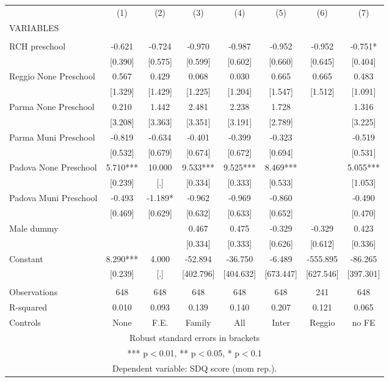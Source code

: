 \begin{tabular}{lccccccc} \hline
 & (1) & (2) & (3) & (4) & (5) & (6) & (7) \\
VARIABLES &  &  &  &  &  &  &  \\ \hline
 &  &  &  &  &  &  &  \\
RCH preschool & -0.621 & -0.724 & -0.970 & -0.987 & -0.952 & -0.952 & -0.751* \\
 & [0.390] & [0.575] & [0.599] & [0.602] & [0.660] & [0.645] & [0.404] \\
Reggio None Preschool & 0.567 & 0.429 & 0.068 & 0.030 & 0.665 & 0.665 & 0.483 \\
 & [1.329] & [1.429] & [1.225] & [1.204] & [1.547] & [1.512] & [1.091] \\
Parma None Preschool & 0.210 & 1.442 & 2.481 & 2.238 & 1.728 &  & 1.316 \\
 & [3.208] & [3.363] & [3.351] & [3.191] & [2.789] &  & [3.225] \\
Parma Muni Preschool & -0.819 & -0.634 & -0.401 & -0.399 & -0.323 &  & -0.519 \\
 & [0.532] & [0.679] & [0.674] & [0.672] & [0.694] &  & [0.531] \\
Padova None Preschool & 5.710*** & 10.000 & 9.533*** & 9.525*** & 8.469*** &  & 5.055*** \\
 & [0.239] & [.] & [0.334] & [0.333] & [0.533] &  & [1.053] \\
Padova Muni Preschool & -0.493 & -1.189* & -0.962 & -0.969 & -0.860 &  & -0.490 \\
 & [0.469] & [0.629] & [0.632] & [0.633] & [0.652] &  & [0.470] \\
Male dummy &  &  & 0.467 & 0.475 & -0.329 & -0.329 & 0.423 \\
 &  &  & [0.334] & [0.333] & [0.626] & [0.612] & [0.336] \\
Constant & 8.290*** & 4.000 & -52.894 & -36.750 & -6.489 & -555.895 & -86.265 \\
 & [0.239] & [.] & [402.796] & [404.632] & [673.447] & [627.546] & [397.301] \\
 &  &  &  &  &  &  &  \\
Observations & 648 & 648 & 648 & 648 & 648 & 241 & 648 \\
R-squared & 0.010 & 0.093 & 0.139 & 0.140 & 0.207 & 0.121 & 0.065 \\
 Controls & None & F.E. & Family & All & Inter & Reggio & no FE \\ \hline
\multicolumn{8}{c}{ Robust standard errors in brackets} \\
\multicolumn{8}{c}{ *** p$<$0.01, ** p$<$0.05, * p$<$0.1} \\
\multicolumn{8}{c}{ Dependent variable: SDQ score (mom rep.).} \\
\end{tabular}
